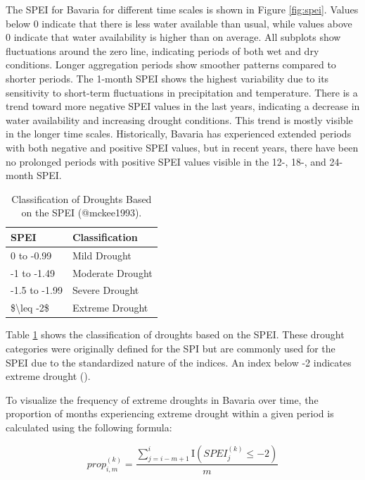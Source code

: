 \documentclass[
]{krantz}
\begin{document}
The SPEI for Bavaria for different time scales is shown in Figure \ref{fig:spei}.
Values below 0 indicate that there is less water available than usual, while values above 0 indicate that water availability is higher than on average.
All subplots show fluctuations around the zero line, indicating periods of both wet and dry conditions. Longer aggregation periods show smoother patterns compared to shorter periods.
The 1-month SPEI shows the highest variability due to its sensitivity to short-term fluctuations in precipitation and temperature.
There is a trend toward more negative SPEI values in the last years, indicating a decrease in water availability and increasing drought conditions. This trend is mostly visible in the longer time scales.
Historically, Bavaria has experienced extended periods with both negative and positive SPEI values, but in recent years, there have been no prolonged periods with positive SPEI values visible in the 12-, 18-, and 24-month SPEI.

\begin{table}

\caption{\label{tab:speiClassification}Classification of Droughts Based on the SPEI (@mckee1993).}
\centering
\begin{tabular}[t]{ll}
\toprule
SPEI & Classification\\
\midrule
0 to -0.99 & Mild Drought\\
-1 to -1.49 & Moderate Drought\\
-1.5 to -1.99 & Severe Drought\\
\$\textbackslash{}leq -2\$ & Extreme Drought\\
\bottomrule
\end{tabular}
\end{table}

Table \ref{tab:speiClassification} shows the classification of droughts based on the SPEI. These drought categories were originally defined for the SPI but are commonly used for the SPEI due to the standardized nature of the indices.
An index below -2 indicates extreme drought (\citet{mckee1993}).

To visualize the frequency of extreme droughts in Bavaria over time, the proportion of months experiencing extreme drought within a given period is calculated using the following formula:

\begin{equation}
prop_{i,m}^{(k)} = \frac{\sum_{j=i-m+1}^{i} \text{I}(SPEI_{j}^{(k)} \leq -2)}{m}
\end{equation}
\end{document}
